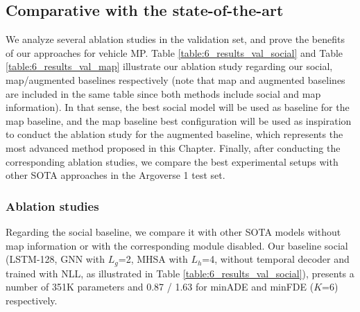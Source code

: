 \subsection{Comparative with the state-of-the-art}
\label{subsec:6_efficient_baselines_comparative_sota}

We analyze several ablation studies in the validation set, and prove the benefits of our approaches for vehicle \ac{MP}. Table \ref{table:6_results_val_social} and Table \ref{table:6_results_val_map} illustrate our ablation study regarding our social, map/augmented baselines respectively (note that map and augmented baselines are included in the same table since both methods include social and map information). In that sense, the best social model will be used as baseline for the map baseline, and the map baseline best configuration will be used as inspiration to conduct the ablation study for the augmented baseline, which represents the most advanced method proposed in this Chapter. Finally, after conducting the corresponding ablation studies, we compare the best experimental setups with other \ac{SOTA} approaches in the Argoverse 1 test set.

\subsubsection{Ablation studies}
\label{subsubsec:6_efficient_baselines_ablation_studies}

Regarding the social baseline, we compare it with other \ac{SOTA} models \cite{liang2020learning, khandelwal2020if, schmidt2022crat} without map information or with the corresponding module disabled. Our baseline social (\ac{LSTM}-128, \ac{GNN} with $L_g$=2, \ac{MHSA} with $L_h$=4, without temporal decoder and trained with \ac{NLL}, as illustrated in Table \ref{table:6_results_val_social}), presents a number of 351K parameters and 0.87 / 1.63 for \ac{minADE} and \ac{minFDE} ($K$=6) respectively.

